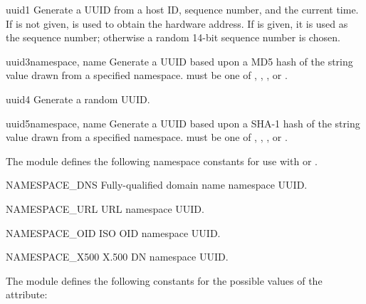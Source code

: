\begin{funcdesc}{uuid1}{}
Generate a UUID from a host ID, sequence number, and the current time.
If  is not given,  is used to obtain the
hardware address.
If  is given, it is used as the sequence number;
otherwise a random 14-bit sequence number is chosen.
\end{funcdesc}

\begin{funcdesc}{uuid3}{namespace, name}
Generate a UUID based upon a MD5 hash of the  string value
drawn from a specified namespace.   
must be one of ,
, ,
or .
\end{funcdesc}

\begin{funcdesc}{uuid4}{}
Generate a random UUID.
\end{funcdesc}

\begin{funcdesc}{uuid5}{namespace, name}
Generate a UUID based upon a SHA-1 hash of the  string value
drawn from a specified namespace.   
must be one of ,
, ,
or .
\end{funcdesc}

The  module defines the following namespace constants
for use with  or .

\begin{datadesc}{NAMESPACE_DNS}
Fully-qualified domain name namespace UUID.
\end{datadesc}

\begin{datadesc}{NAMESPACE_URL}
URL namespace UUID.
\end{datadesc}

\begin{datadesc}{NAMESPACE_OID}
ISO OID namespace UUID.
\end{datadesc}

\begin{datadesc}{NAMESPACE_X500}
X.500 DN namespace UUID.
\end{datadesc}

The  module defines the following constants
for the possible values of the  attribute:

